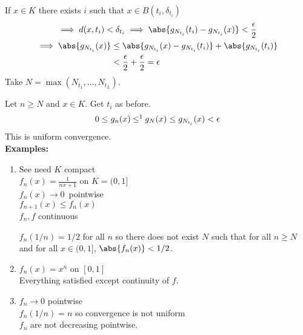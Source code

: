 If $x\in K$ there exists $i$ such that $x\in B(t_i,\delta_{t_i})$
\begin{gather*}
\implies d(x,t_i)<\delta_{t_i} \implies \abs{g_{N_{t_i}}(t_i)-g_{N_{t_i}}(x)} < \frac{\epsilon}{2} \\
\begin{aligned}
\implies \abs{g_{N_{t_i}}(x)} &\leq \abs{g_{N_{t_i}}(x)-g_{N_{t_i}}(t_i)} + \abs{g_{N_{t_i}}(t_i)} \\
&< \frac{\epsilon}{2} + \frac{\epsilon}{2} = \epsilon
\end{aligned}
\end{gather*}
Take $N=\max(N_{t_1},\dotsc,N_{t_L})$.

Let $n\geq N$ and $x\in K$.  Get $t_i$ as before.
\[ 0\leq g_n(x) \mathbin{\mathord{\leq}\footnotemark} g_N(x) \leq g_{N_{t_i}}(x)<\epsilon \]%
This is uniform convergence. \\
\textbf{Examples:}
\begin{enumerate}
\item See need $K$ compact \\
$f_n(x)=\frac{1}{nx+1}$ on $K=(0,1]$ \\
$f_n(x)\to0$\footnotemark\ pointwise \\
$f_{n+1}(x)\leq f_n(x)$ \\
$f_n, f$ continuous

$f_n(1/n)=1/2$ for all $n$ so there does not exist $N$ such that for all $n\geq N$ and for all $x\in(0,1]$, $\abs{f_n(x)}<1/2$.
\item $f_n(x)=x^n$ on $[0,1]$ \\
Everything satisfied except continuity of $f$.
\item{}
$f_n\to0$ pointwise \\
$f_n(1/n)=n$ so convergence is not uniform \\
$f_n$ are not decreasing pointwise.
\end{enumerate}

